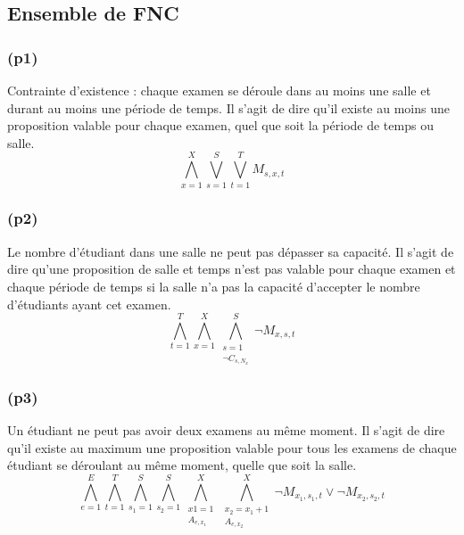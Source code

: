 \documentclass[a4paper,11pt]{article}
\begin{document}
\subsection{Ensemble de FNC}
\subsubsection{(p1)}
Contrainte d'existence : chaque examen se déroule dans au moins une salle et durant au moins une période de temps.
Il s'agit de dire qu'il existe au moins une proposition valable pour chaque examen, quel que soit la période de temps ou salle.
\begin{displaymath}
	\bigwedge\limits_{x=1}^{X}\bigvee\limits_{s=1}^{S}\bigvee\limits_{t=1}^{T} M_{s,x,t}
\end{displaymath}


\subsubsection{(p2)}
Le nombre d'étudiant dans une salle ne peut pas dépasser sa capacité.
Il s'agit de dire qu'une proposition de salle et temps n'est pas valable pour chaque examen et chaque période de temps si la salle n'a pas la capacité d'accepter le nombre d'étudiants ayant cet examen.
\begin{displaymath}
	\bigwedge\limits_{t=1}^{T}\bigwedge\limits_{x=1}^{X}\bigwedge\limits_{\substack{s=1 \\ \neg C_{s,N_{x}}}}^{S}  \neg M_{x,s,t}
\end{displaymath}

\subsubsection{(p3)}
Un étudiant ne peut pas avoir deux examens au même moment.
Il s'agit de dire qu'il existe au maximum une proposition valable pour tous les examens de chaque étudiant se déroulant au même moment, quelle que soit la salle.
\begin{displaymath}
\bigwedge\limits_{e=1}^{E}\bigwedge\limits_{t=1}^{T}\bigwedge\limits_{s_{1}=1}^{S}\bigwedge\limits_{s_{2}=1}^{S}\bigwedge\limits_{\substack{x1=1 \\ A_{e,x_{1}}}}^{X}\bigwedge\limits_{\substack{x_{2}=x_{1}+1 \\ A_{e,x_{2}}}}^{X} \neg M_{x_{1}, s_{1}, t} \vee \neg M_{x_{2}, s_{2}, t}
\end{displaymath}
\end{document}
